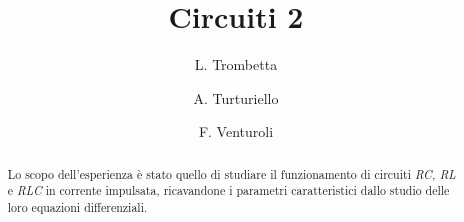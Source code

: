\begin{frontmatter}
%
\title{Circuiti 2}
%
\author{L. Trombetta} 
\author{A. Turturiello}
\author{F. Venturoli}
%
%
\renewcommand*{\today}{\MonthYearDateFormat\displaydate{dateName}} 
%

\begin{abstract}

Lo scopo dell'esperienza è stato quello di studiare il funzionamento di circuiti \textit{RC, RL} e \textit{RLC} in corrente impulsata, ricavandone i parametri caratteristici dallo studio delle loro equazioni differenziali.

\end{abstract}
%
\end{frontmatter}
%
%
%
 \vspace{1cm}

 \begin{minipage}{\textwidth}
     \tableofcontents
 \end{minipage}
 \clearpage